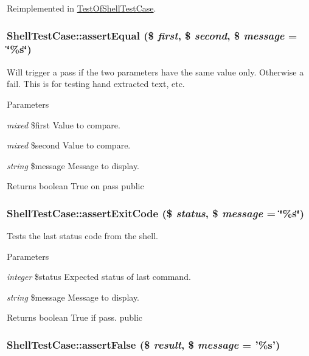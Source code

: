 Reimplemented in \hyperlink{class_test_of_shell_test_case_af3aa12f7445154b54aaa645ca973acac}{TestOfShellTestCase}.\hypertarget{class_shell_test_case_a9cfcfcb3b0516f335ce01944a2fdf0b4}{
\subsubsection[{assertEqual}]{\setlength{\rightskip}{0pt plus 5cm}ShellTestCase::assertEqual (\$ {\em first}, \/  \$ {\em second}, \/  \$ {\em message} = {\ttfamily \char`\"{}\%s\char`\"{}})}}
\label{class_shell_test_case_a9cfcfcb3b0516f335ce01944a2fdf0b4}
Will trigger a pass if the two parameters have the same value only. Otherwise a fail. This is for testing hand extracted text, etc. 
\begin{DoxyParams}{Parameters}
\item[{\em mixed}]\$first Value to compare. \item[{\em mixed}]\$second Value to compare. \item[{\em string}]\$message Message to display. \end{DoxyParams}
\begin{DoxyReturn}{Returns}
boolean True on pass  public 
\end{DoxyReturn}
\hypertarget{class_shell_test_case_a6d3b93005e0dd60d768c65f5b2f813c6}{
\subsubsection[{assertExitCode}]{\setlength{\rightskip}{0pt plus 5cm}ShellTestCase::assertExitCode (\$ {\em status}, \/  \$ {\em message} = {\ttfamily \char`\"{}\%s\char`\"{}})}}
\label{class_shell_test_case_a6d3b93005e0dd60d768c65f5b2f813c6}
Tests the last status code from the shell. 
\begin{DoxyParams}{Parameters}
\item[{\em integer}]\$status Expected status of last command. \item[{\em string}]\$message Message to display. \end{DoxyParams}
\begin{DoxyReturn}{Returns}
boolean True if pass.  public 
\end{DoxyReturn}
\hypertarget{class_shell_test_case_a5457ff8ac3d1832fc34f8cae2e82fb5d}{
\subsubsection[{assertFalse}]{\setlength{\rightskip}{0pt plus 5cm}ShellTestCase::assertFalse (\$ {\em result}, \/  \$ {\em message} = {\ttfamily '\%s'})}}
